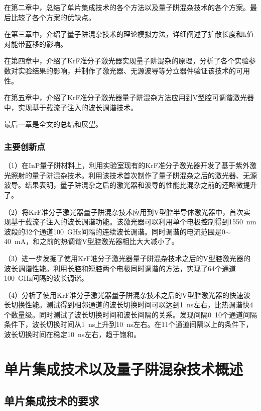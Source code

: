 \documentclass{ZJUthesis}
\begin{document}
在第二章中，总结了单片集成技术的各个方法以及量子阱混杂技术的各个方案。最后比较了各个方案的优缺点。

在第三章中，介绍了量子阱混杂技术的理论模拟方法，详细阐述了扩散长度和k值对能带蓝移的影响。

在第四章中，介绍了KrF准分子激光器实现量子阱混杂的原理，分析了各个实验参数对实验结果的影响，并制作了激光器、无源波导等分立器件验证该技术的可用性。

在第五章中，介绍了KrF准分子激光器量子阱混杂方法应用到V型腔可调谐激光器中，实现基于载流子注入的波长调谐技术。

最后一章是全文的总结和展望。

\subsection{主要创新点}

（1）在InP量子阱材料上，利用实验室现有的KrF准分子激光器开发了基于紫外激光照射的量子阱混杂技术。利用该技术首次制作了量子阱混杂之后的激光器、无源波导。结果表明，量子阱混杂之后的激光器和波导的性能比混杂之前的还略微提升了。

（2）将KrF准分子激光器量子阱混杂技术应用到V型腔半导体激光器中，首次实现基于载流子注入的波长调谐功能。该激光器可以利用单个电极控制得到1550~nm波段的32个通道100~GHz间隔的连续波长调谐。同时调谐的电流范围是0$\sim$40~mA，和之前的热调谐V型腔激光器相比大大减小了。

（3）进一步发掘了使用KrF准分子激光器量子阱混杂技术之后的V型腔激光器的波长调谐性能。利用长腔和短腔两个电极同时调谐的方法，实现了64个通道100~GHz间隔的波长调谐。

（4）分析了使用KrF准分子激光器量子阱混杂技术之后的V型腔激光器的快速波长切换性能。测试得到相邻通道的波长切换时间可以达到1~ns左右，比热调谐快4个数量级。同时测试了波长切换时间和波长间隔的关系。发现间隔0~10个通道间隔条件下，波长切换时间从1~ns上升到10~ns左右。在11个通道间隔以上的条件下，波长切换时间在稳定10~ns左右，趋于饱和。

\chapter{单片集成技术以及量子阱混杂技术概述}

\section{单片集成技术的要求}
\end{document}
